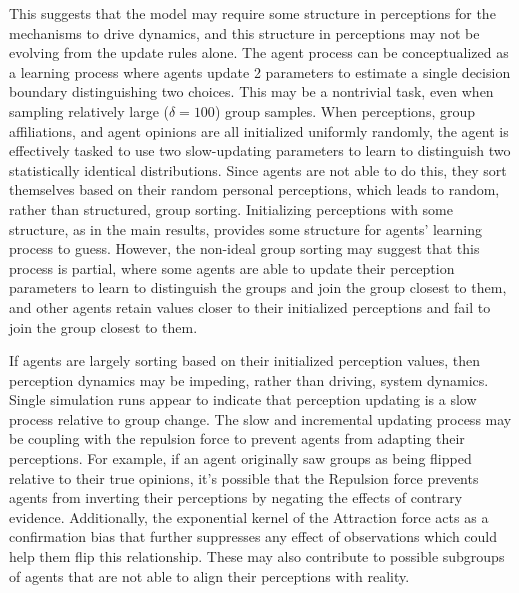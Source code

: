 This suggests that the model may require some structure in perceptions for the mechanisms to drive dynamics, and this structure in perceptions may not be evolving from the update rules alone. The agent process can be conceptualized as a learning process where agents update 2 parameters to estimate a single decision boundary distinguishing two choices. This may be a nontrivial task, even when sampling relatively large ($\delta = 100$) group samples. When perceptions, group affiliations, and agent opinions are all initialized uniformly randomly, the agent is effectively tasked to use two slow-updating parameters to learn to distinguish two statistically identical distributions. Since agents are not able to do this, they sort themselves based on their random personal perceptions, which leads to random, rather than structured, group sorting. Initializing perceptions with some structure, as in the main results, provides some structure for agents' learning process to guess. However, the non-ideal group sorting may suggest that this process is partial, where some agents are able to update their perception parameters to learn to distinguish the groups and join the group closest to them, and other agents retain values closer to their initialized perceptions and fail to join the group closest to them.  

If agents are largely sorting based on their initialized perception values, then perception dynamics may be impeding, rather than driving, system dynamics. 
Single simulation runs appear to indicate that perception updating is a slow process relative to group change. 
The slow and incremental updating process may be coupling with the repulsion force to prevent agents from adapting their perceptions. 
For example, if an agent originally saw groups as being flipped relative to their true opinions, it's possible that the Repulsion force prevents agents from inverting their perceptions by negating the effects of contrary evidence. 
Additionally, the exponential kernel of the Attraction force acts as a confirmation bias that further suppresses any effect of observations which could help them flip this relationship. 
These may also contribute to possible subgroups of agents that are not able to align their perceptions with reality. 

